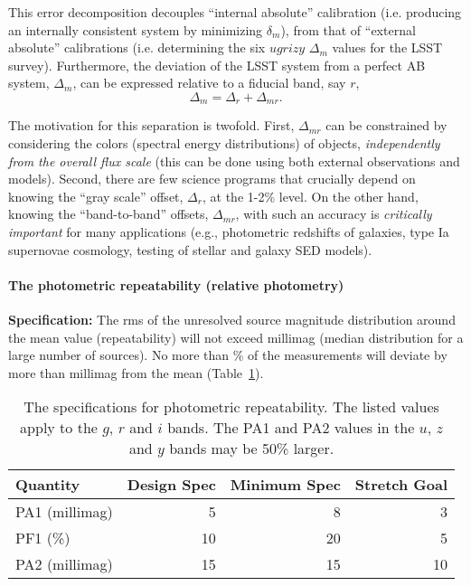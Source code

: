 This error decomposition decouples ``internal absolute'' calibration
(i.e. producing an internally consistent system by minimizing $\delta_m$),
from that of ``external absolute'' calibrations (i.e. determining the six
$ugrizy$ $\Delta_m$  values for the LSST survey). Furthermore, the deviation
of the LSST system from a perfect AB system, $\Delta_m$, can be expressed
relative to a fiducial band, say $r$,
\begin{equation}
            \Delta_m = \Delta_r + \Delta_{mr}.
\end{equation}

The motivation for this separation is twofold. First, $\Delta_{mr}$ can
be constrained by considering the colors (spectral energy distributions)
of objects, {\it independently from the overall flux scale} (this can
be done using both external observations and models). Second, there are
few science programs that crucially depend on knowing the ``gray
scale'' offset, $\Delta_r$, at the 1-2\% level. On the other hand,
knowing the ``band-to-band'' offsets, $\Delta_{mr}$, with such an
accuracy is {\it critically important} for many applications (e.g.,
photometric redshifts of galaxies, type Ia supernovae cosmology, testing
of stellar and galaxy SED models).



\paragraph{The photometric repeatability (relative photometry)\\}

{\bf Specification:} The rms of the unresolved source magnitude
distribution around the mean value (repeatability) will not exceed
millimag (median distribution for a large number of sources). No more than
\% of the measurements will deviate by more than
 millimag from the mean (Table~\ref{relPhotometry}).


\begin{table}[h]
\begin{tabular}{|l|r|r|r|}
\hline
Quantity   & Design Spec & Minimum Spec & Stretch Goal   \\
\hline
      PA1 (millimag)  &     5       &       8      &        3  \\
      PF1  (\%)       &    10       &      20      &        5  \\
      PA2 (millimag)  &    15       &      15      &       10  \\
\hline
\end{tabular}
\caption{The specifications for photometric repeatability. The listed
values apply to the $g$, $r$ and $i$ bands.  The PA1 and PA2 values in
the $u$, $z$ and $y$ bands may be 50\% larger.}
\label{relPhotometry}
\end{table}

